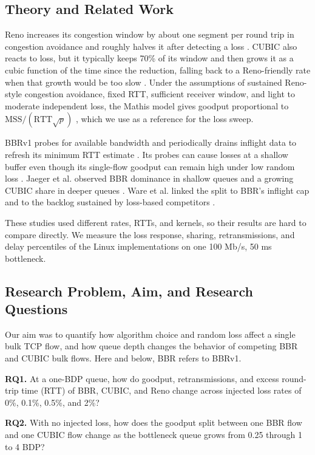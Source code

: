 \documentclass[11pt,a4paper]{article}
\begin{document}
\subsection{Theory and Related Work}

Reno increases its congestion window by about one segment per round trip in congestion avoidance and roughly halves it after detecting a loss \cite{allman2009}. CUBIC also reacts to loss, but it typically keeps 70\% of its window and then grows it as a cubic function of the time since the reduction, falling back to a Reno-friendly rate when that growth would be too slow \cite{xu2023}. Under the assumptions of sustained Reno-style congestion avoidance, fixed RTT, sufficient receiver window, and light to moderate independent loss, the Mathis model gives goodput proportional to $\mathrm{MSS}/(\mathrm{RTT}\sqrt{p})$ \cite{mathis1997}, which we use as a reference for the loss sweep.

BBRv1 probes for available bandwidth and periodically drains inflight data to refresh its minimum RTT estimate \cite{cardwell2017}. Its probes can cause losses at a shallow buffer even though its single-flow goodput can remain high under low random loss \cite{cao2019}. Jaeger et al. observed BBR dominance in shallow queues and a growing CUBIC share in deeper queues \cite{jaeger2019}. Ware et al. linked the split to BBR's inflight cap and to the backlog sustained by loss-based competitors \cite{ware2019}.

These studies used different rates, RTTs, and kernels, so their results are hard to compare directly. We measure the loss response, sharing, retransmissions, and delay percentiles of the Linux implementations on one 100 Mb/s, 50 ms bottleneck.

\subsection{Research Problem, Aim, and Research Questions}

Our aim was to quantify how algorithm choice and random loss affect a single bulk TCP flow, and how queue depth changes the behavior of competing BBR and CUBIC bulk flows. Here and below, BBR refers to BBRv1.

\begingroup
\setlength{\parskip}{5pt}
\textbf{RQ1.} At a one-BDP queue, how do goodput, retransmissions, and excess round-trip time (RTT) of BBR, CUBIC, and Reno change across injected loss rates of 0\%, 0.1\%, 0.5\%, and 2\%?

\textbf{RQ2.} With no injected loss, how does the goodput split between one BBR flow and one CUBIC flow change as the bottleneck queue grows from 0.25 through 1 to 4 BDP?
\end{document}
